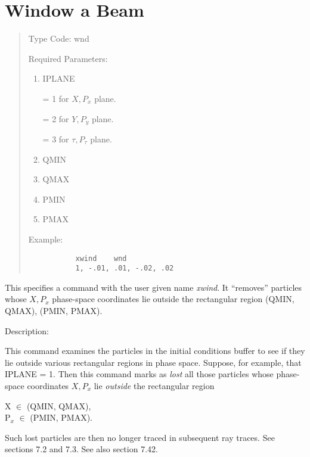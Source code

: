 \newpage
\section{Window a Beam}
\begin{quotation}
\noindent Type Code:  wnd 
\vspace{5mm}

\noindent Required Parameters:
\begin{enumerate}
      \item  IPLANE

             = 1 for $X, P_x$ plane.

             = 2 for $Y, P_y$ plane.

             = 3 for ${\tau}, P_{\tau}$ plane.

      \item  QMIN
      \item  QMAX
      \item  PMIN
      \item  PMAX
\end{enumerate}

\vspace{5mm}
\noindent Example:
\begin{verbatim}
           xwind    wnd
           1, -.01, .01, -.02, .02
\end{verbatim}
\end{quotation}
This specifies a command with the user given name {\em xwind}.  It
``removes'' particles whose $X, P_x$ phase-space coordinates lie outside the
rectangular region (QMIN, QMAX), (PMIN, PMAX).

\vspace{5mm}
    Description:
\vspace{2mm}

This command examines the particles in the initial conditions buffer to see if
they lie outside various rectangular regions in phase space.  Suppose,
for example, that IPLANE = 1.  Then this command marks as {\em lost} all those particles whose phase-space coordinates $X, P_x$ lie {\em outside} the rectangular
region
\begin{center}
X $\in$ (QMIN, QMAX), \\
P$_x$ $\in$ (PMIN, PMAX).
\end{center}
Such lost particles are then no longer traced in subsequent ray traces.  See
sections 7.2 and 7.3.  See also section 7.42.

\newpage
